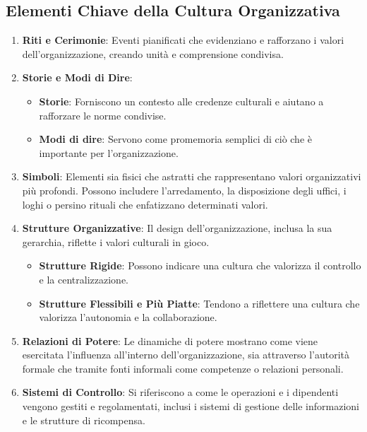 \documentclass{article}
\begin{document}
\subsection{Elementi Chiave della Cultura Organizzativa}

\begin{enumerate}
    \item \textbf{Riti e Cerimonie}: Eventi pianificati che evidenziano e rafforzano i valori dell'organizzazione, creando unità e comprensione condivisa.

    \item \textbf{Storie e Modi di Dire}:
    \begin{itemize}
        \item \textbf{Storie}: Forniscono un contesto alle credenze culturali e aiutano a rafforzare le norme condivise.
        \item \textbf{Modi di dire}: Servono come promemoria semplici di ciò che è importante per l'organizzazione.
    \end{itemize}

    \item \textbf{Simboli}: Elementi sia fisici che astratti che rappresentano valori organizzativi più profondi. Possono includere l'arredamento, la disposizione degli uffici, i loghi o persino rituali che enfatizzano determinati valori.

    \item \textbf{Strutture Organizzative}: Il design dell'organizzazione, inclusa la sua gerarchia, riflette i valori culturali in gioco.
    \begin{itemize}
        \item \textbf{Strutture Rigide}: Possono indicare una cultura che valorizza il controllo e la centralizzazione.
        \item \textbf{Strutture Flessibili e Più Piatte}: Tendono a riflettere una cultura che valorizza l'autonomia e la collaborazione.
    \end{itemize}

    \item \textbf{Relazioni di Potere}: Le dinamiche di potere mostrano come viene esercitata l'influenza all'interno dell'organizzazione, sia attraverso l'autorità formale che tramite fonti informali come competenze o relazioni personali.

    \item \textbf{Sistemi di Controllo}: Si riferiscono a come le operazioni e i dipendenti vengono gestiti e regolamentati, inclusi i sistemi di gestione delle informazioni e le strutture di ricompensa.
\end{enumerate}
\end{document}
